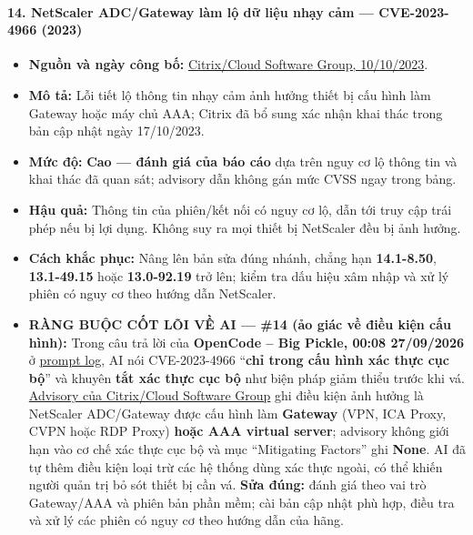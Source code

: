 \paragraph{14. NetScaler ADC/Gateway làm lộ dữ liệu nhạy cảm --- CVE-2023-4966 (2023)}\label{netscaler-adcgateway-luxe0m-lux1ed9-dux1eef-liux1ec7u-nhux1ea1y-cux1ea3m-cve-2023-4966-2023}

\begin{itemize}
\tightlist
\item
  \textbf{Nguồn và ngày công bố:} \href{https://support.citrix.com/external/article/579459/netscaler-adc-and-netscaler-gateway-secu.html}{Citrix/Cloud Software Group, 10/10/2023}.
\item
  \textbf{Mô tả:} Lỗi tiết lộ thông tin nhạy cảm ảnh hưởng thiết bị cấu hình làm Gateway hoặc máy chủ AAA; Citrix đã bổ sung xác nhận khai thác trong bản cập nhật ngày 17/10/2023.
\item
  \textbf{Mức độ:} \textbf{Cao --- đánh giá của báo cáo} dựa trên nguy cơ lộ thông tin và khai thác đã quan sát; advisory dẫn không gán mức CVSS ngay trong bảng.
\item
  \textbf{Hậu quả:} Thông tin của phiên/kết nối có nguy cơ lộ, dẫn tới truy cập trái phép nếu bị lợi dụng. Không suy ra mọi thiết bị NetScaler đều bị ảnh hưởng.
\item
  \textbf{Cách khắc phục:} Nâng lên bản sửa đúng nhánh, chẳng hạn \textbf{14.1-8.50}, \textbf{13.1-49.15} hoặc \textbf{13.0-92.19} trở lên; kiểm tra dấu hiệu xâm nhập và xử lý phiên có nguy cơ theo hướng dẫn NetScaler.
\item
  \textbf{RÀNG BUỘC CỐT LÕI VỀ AI --- \#14 (ảo giác về điều kiện cấu hình):} Trong câu trả lời của \textbf{OpenCode -- Big Pickle, 00:08 27/09/2026} ở \href{Appendix_A_Prompt_Log.md}{prompt log}, AI nói CVE-2023-4966 ``\textbf{chỉ trong cấu hình xác thực cục bộ}'' và khuyên \textbf{tắt xác thực cục bộ} như biện pháp giảm thiểu trước khi vá. \href{https://support.citrix.com/external/article/579459/netscaler-adc-and-netscaler-gateway-secu.html}{Advisory của Citrix/Cloud Software Group} ghi điều kiện ảnh hưởng là NetScaler ADC/Gateway được cấu hình làm \textbf{Gateway} (VPN, ICA Proxy, CVPN hoặc RDP Proxy) \textbf{hoặc AAA virtual server}; advisory không giới hạn vào cơ chế xác thực cục bộ và mục ``Mitigating Factors'' ghi \textbf{None}. AI đã tự thêm điều kiện loại trừ các hệ thống dùng xác thực ngoài, có thể khiến người quản trị bỏ sót thiết bị cần vá. \textbf{Sửa đúng:} đánh giá theo vai trò Gateway/AAA và phiên bản phần mềm; cài bản cập nhật phù hợp, điều tra và xử lý các phiên có nguy cơ theo hướng dẫn của hãng.
\end{itemize}

